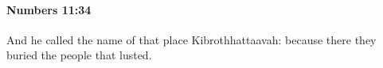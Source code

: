 
		\paragraph{Numbers 11:34} %
			\label{NUMBERS-11-34}

			And he called the name of that place Kibrothhattaavah: because there they buried the people that lusted.


